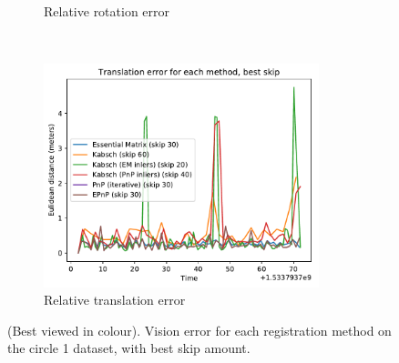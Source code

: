 \documentclass[12pt,a4paper]{article}
\begin{document}
\begin{figure}[b!]
\begin{subfigure}[t]{0.5\textwidth}
        \caption{Relative rotation error}
      \end{subfigure} %
      ~
      \begin{subfigure}[t]{0.5\textwidth}
        \includegraphics[width=80mm]{../quad/basic-reg-saves/methods/et_best_r.pdf}
        \caption{Relative translation error}
      \end{subfigure}
      \caption{(Best viewed in colour). Vision error for each registration method on the circle 1 dataset, with best skip amount.}
      \label{f: quad3 error}
    \end{figure}
\end{document}
